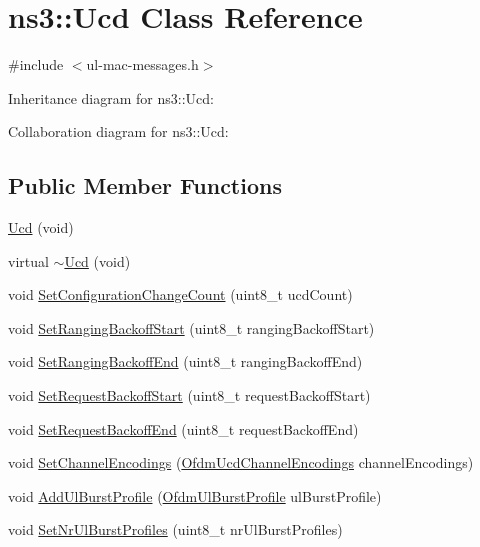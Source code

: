 \hypertarget{classns3_1_1Ucd}{}\section{ns3\+:\+:Ucd Class Reference}
\label{classns3_1_1Ucd}


{\ttfamily \#include $<$ul-\/mac-\/messages.\+h$>$}



Inheritance diagram for ns3\+:\+:Ucd\+:


Collaboration diagram for ns3\+:\+:Ucd\+:
\subsection*{Public Member Functions}
\begin{DoxyCompactItemize}
\item 
\hyperlink{classns3_1_1Ucd_aed5443cdc5dcc001e7a743ef3e2132c0}{Ucd} (void)
\item 
virtual \hyperlink{classns3_1_1Ucd_a74967c70db6b0b533497df81f9bcde41}{$\sim$\+Ucd} (void)
\item 
void \hyperlink{classns3_1_1Ucd_a93be0a2375bb73ec4aeaa8e85f709fef}{Set\+Configuration\+Change\+Count} (uint8\+\_\+t ucd\+Count)
\item 
void \hyperlink{classns3_1_1Ucd_a9ad2ea963c6d98bddbef9a1e4b4ba892}{Set\+Ranging\+Backoff\+Start} (uint8\+\_\+t ranging\+Backoff\+Start)
\item 
void \hyperlink{classns3_1_1Ucd_a9fcf97edec8e845bffa6302e16cb2e33}{Set\+Ranging\+Backoff\+End} (uint8\+\_\+t ranging\+Backoff\+End)
\item 
void \hyperlink{classns3_1_1Ucd_ae9efbad95bce10c4f139e525ac68731e}{Set\+Request\+Backoff\+Start} (uint8\+\_\+t request\+Backoff\+Start)
\item 
void \hyperlink{classns3_1_1Ucd_acd456d07a84e3b40b866ec61f75b4226}{Set\+Request\+Backoff\+End} (uint8\+\_\+t request\+Backoff\+End)
\item 
void \hyperlink{classns3_1_1Ucd_a6c9040a25ef14b90774c992a45f7becc}{Set\+Channel\+Encodings} (\hyperlink{classns3_1_1OfdmUcdChannelEncodings}{Ofdm\+Ucd\+Channel\+Encodings} channel\+Encodings)
\item 
void \hyperlink{classns3_1_1Ucd_a4b007bc9afca2c4b31949a49c24303e9}{Add\+Ul\+Burst\+Profile} (\hyperlink{classns3_1_1OfdmUlBurstProfile}{Ofdm\+Ul\+Burst\+Profile} ul\+Burst\+Profile)
\item 
void \hyperlink{classns3_1_1Ucd_a0b80c7afe13657e81258faf2712788dd}{Set\+Nr\+Ul\+Burst\+Profiles} (uint8\+\_\+t nr\+Ul\+Burst\+Profiles)

\end{DoxyCompactItemize}
